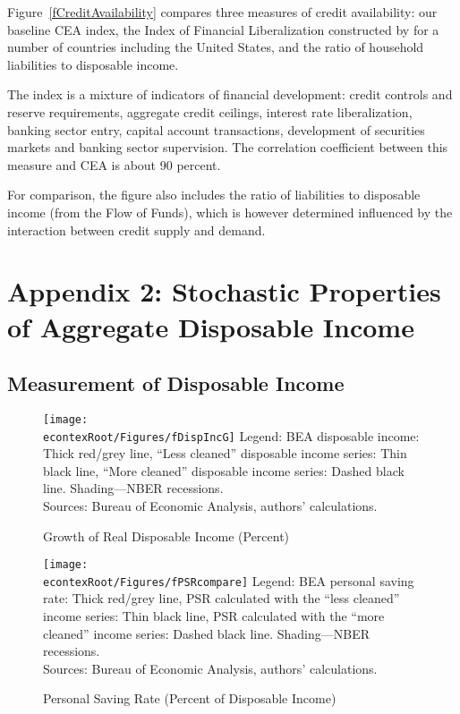 \documentclass[titlepage]{\econtex}
\begin{document}
Figure~\ref{fCreditAvailability} compares three measures of credit availability: our baseline CEA index, the Index of Financial Liberalization constructed by \cite{abiadEtAl_FinReforms} for a number of countries including the United States, and the ratio of household liabilities to disposable income.

The \citeauthor{abiadEtAl_FinReforms} index is a mixture of indicators of financial development: credit controls and reserve requirements, aggregate credit ceilings, interest rate liberalization, banking sector entry, capital account transactions, development of securities markets and banking sector supervision. The correlation coefficient between this measure and CEA is about 90 percent.

For comparison, the figure also includes the ratio of liabilities to disposable income (from the Flow of Funds), which is however determined influenced by the interaction between credit supply and demand.




\section*{Appendix 2: Stochastic Properties of Aggregate Disposable Income}

\subsection*{Measurement of Disposable Income}

\begin{figure}
\caption{Growth of Real Disposable Income (Percent) \label{fDispIncG}}
\texttt{[image: \\econtexRoot/Figures/fDispIncG]}
\footnotesize
Legend: BEA disposable income: Thick red/grey line,  ``Less cleaned'' disposable income series: Thin black line, ``More cleaned'' disposable income series: Dashed black line. Shading---NBER recessions.\\[0mm]
\tiny Sources: Bureau of Economic Analysis, authors' calculations.
\end{figure}

\begin{figure}
\caption{Personal Saving Rate (Percent of Disposable Income) \label{fPSRcompare}}
\texttt{[image: \\econtexRoot/Figures/fPSRcompare]}
\footnotesize
Legend: BEA personal saving rate: Thick red/grey line, PSR calculated with the ``less cleaned'' income series: Thin black line, PSR calculated with the ``more cleaned'' income series: Dashed black line. Shading---NBER recessions.\\[0mm]
\tiny Sources: Bureau of Economic Analysis, authors' calculations.
\end{figure}
\end{document}
